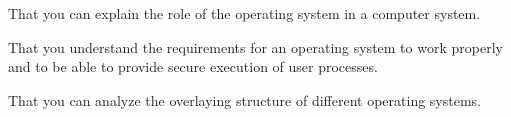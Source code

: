 \item That you can explain the role of the operating system in a computer 
system.
\item That you understand the requirements for an operating system to work 
properly and to be able to provide secure execution of user processes.
\item That you can analyze the overlaying structure of different operating 
systems.
